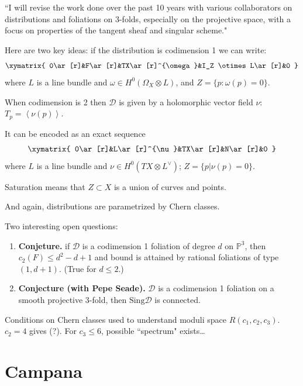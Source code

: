 \documentclass{book}
\begin{document}
``I will revise the work done over the past
10 years with various collaborators on
distributions and foliations on 3-folds,
especially on the projective space, with a
focus on properties of the tangent sheaf and
singular scheme."

Here are two key ideas: if the distribution
is codimension 1 we can write:
$$
\xymatrix{
0\ar[r]&F\ar[r]&TX\ar[r]^{\omega}&I_Z \otimes
L\ar[r]&0
}
$$
where $L$ is a line bundle and
$\omega \in H^{0}(\Omega_X \otimes L)$, and
$Z=\{p:\omega(p)=0\}$.

When codimension is 2 then $\mathcal{D}$ is
given by
a holomorphic vector field
$\nu$: $T_p=\left\langle{}\nu(p)\right\rangle{}$.

It can be encoded as an exact sequence
$$
\xymatrix{
	0\ar[r]&L\ar[r]^{\nu}&TX\ar[r]&N\ar[r]&0
}
$$
where $L$ is a line bundle
and $\nu \in H^{0}(TX \otimes L^\vee)$;
  $Z=\{p | \nu(p) = 0\}$.

\begin{remark}
\label{remark-stauration}
Saturation means that $Z \subset X$ is a
union
of curves and points.
\end{remark}

And again, distributions are parametrized by
Chern classes.

Two interesting open questions:
\begin{enumerate}
\item {\bf Conjeture.} if $\mathcal{D}$ is a
codimension 1 foliation of degree
$d$ on $\mathbb{P}^3$, then $c_2(F)\leq
d^2-d+1$ and
bound is attained
by rational foliations of type $(1,d+1)$.
(True for $d \leq 2$.)
\item {\bf Conjecture (with Pepe Seade).}
$\mathcal{D}$ is a codimension 1
foliation on a smooth projective 3-fold,
then $\text{Sing}\mathcal{D}$ is connected.
\end{enumerate}

\begin{theorem}
\label{theorem-jardim-muniz}
Conditions on Chern classes used to
understand moduli space $R(c_1,c_2,c_3)$.
$c_2=4$ gives (?). For $c_3\leq 6$, possible
``spectrum" exists…
\end{theorem}









\section{Campana}
\label{section-campana}
\end{document}
